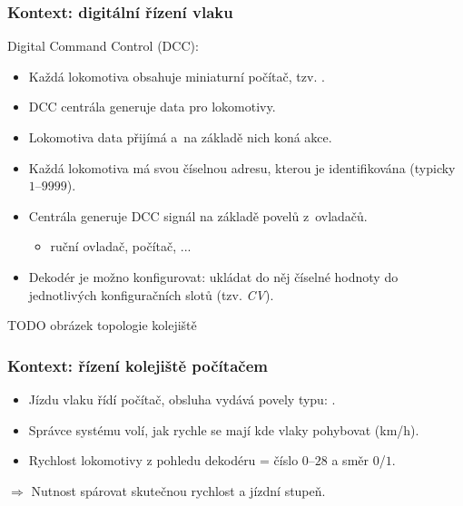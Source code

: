 \documentclass[aspectratio=169]{beamer}
\begin{document}

\begin{frame}
\frametitle{Kontext: digitální řízení vlaku}
Digital Command Control (DCC):
\begin{itemize}
\item Každá lokomotiva obsahuje miniaturní počítač, tzv. .
\item DCC centrála generuje data pro lokomotivy.
\item Lokomotiva data přijímá a na základě nich koná akce.
\item Každá lokomotiva má svou číselnou adresu, kterou je identifikována (typicky
$1$--$9999$).
\item Centrála generuje DCC signál na základě povelů z~ovladačů.
\begin{itemize}
\item ruční ovladač, počítač, ...
\end{itemize}
\item Dekodér je možno konfigurovat: ukládat do něj číselné hodnoty do jednotlivých
konfiguračních slotů (tzv. \textit{CV}).
\end{itemize}

TODO obrázek topologie kolejiště
\end{frame}


\begin{frame}
\frametitle{Kontext: řízení kolejiště počítačem}
\begin{itemize}
\item Jízdu vlaku řídí počítač, obsluha vydává povely typu: .
\item Správce systému volí, jak rychle se mají kde vlaky pohybovat (km/h).
\item Rychlost lokomotivy z pohledu dekodéru = číslo $0$--$28$ a směr $0$/$1$.
\end{itemize}
$\Rightarrow$ Nutnost spárovat skutečnou rychlost a jízdní stupeň.
\end{frame}

\end{document}

